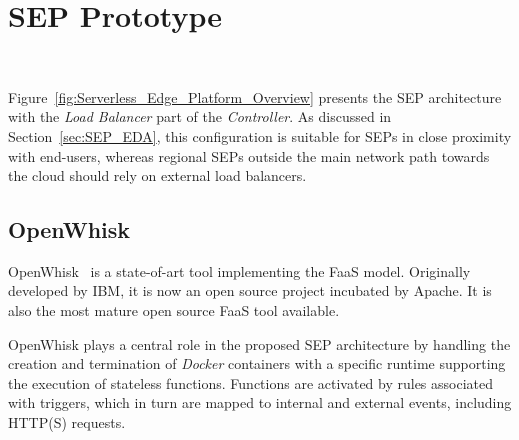 \section{SEP Prototype}~\label{sec:prototype}





Figure~\ref{fig:Serverless_Edge_Platform_Overview} presents the SEP architecture with the \textit{Load Balancer} part of the \textit{Controller}. As discussed in Section~\ref{sec:SEP_EDA}, this configuration is suitable for SEPs in close proximity with end-users, whereas regional SEPs outside the main network path towards the cloud should rely on external load balancers. 

\subsection{OpenWhisk}

OpenWhisk~\cite{OpenWhisk} is a state-of-art tool implementing the FaaS model. Originally developed by IBM, it is now an open source project incubated by Apache. It is also the most mature open source FaaS tool available. 

OpenWhisk plays a central role in the proposed SEP architecture %
by handling the creation and termination of \textit{Docker} containers
with a specific runtime supporting the execution of stateless functions. Functions are activated by rules associated with triggers, which in turn are mapped to internal and external events, including HTTP(S) requests. %

